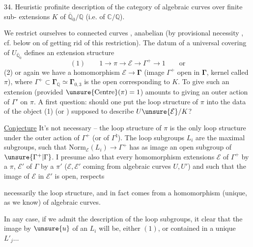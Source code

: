 34. Heuristic profinite description of the category
of algebraic curves  over  finite sub-
extensions $K$ of $\overline{\mathbb Q}_0/\mathbb Q$ (i.e. of $\mathbb C/\mathbb Q$).

We restrict ourselves to  connected curves , anabelian
(by provisional necessity \unsure{!}, cf. below on  of
getting rid of this restriction). The datum of a
universal covering of  $U_{\overline{\mathbb Q}_0}$ defines an
extension structure
\[
(1)\qquad 1\longrightarrow\pi\longrightarrow\mathcal E\longrightarrow\Gamma^{+}\longrightarrow1\qquad\text{or}
\]
(2) or again we have a homomorphism $\mathcal E\longrightarrow\boldsymbol{\Gamma}$
(image $\Gamma^{+}$ open in $\boldsymbol{\Gamma}$,
kernel called $\pi$),
where $\Gamma^{+}\subset\boldsymbol{\Gamma}_{\mathbb Q}\simeq\boldsymbol{\Gamma}_{0,3}$ is the open 
corresponding to $K$. To give such an
extension (provided $\unsure{\mathrm{Centre}}(\pi)=1$) amounts to
giving an outer action of $\Gamma'$ on $\pi$.
A first question: should one put the
loop structure of $\pi$ into the  data  of
the object (1) (or ) supposed to describe $U\unsure{\mathcal E}/K$?

\uline{Conjecture} It's not necessary -- the loop structure
of $\pi$ is the only loop structure 
under the outer action of $\Gamma^{+}$ (or of $\Gamma^{\natural}$). The
loop subgroups $L_i$ are the maximal
subgroups, such that $\mathrm{Norm}_{\mathcal E}(L_i)\longrightarrow\Gamma^{+}$ has
as image an open subgroup of $\unsure{\Gamma^{+}|\Gamma}$.
I
presume also that every homomorphism  extensions
$\mathcal E$ of $\Gamma^{+}$ by a $\pi$, $\mathcal E'$ of $\Gamma$ by a $\pi'$
($\mathcal E,\mathcal E'$ coming from algebraic curves $U,U'$) and such
that the image of $\mathcal E$ in $\mathcal E'$ is open, respects

necessarily the loop structure, and in fact
comes from a homomorphism (unique, as we know) of algebraic
curves.

In any case, if we admit the description of the
loop subgroups, it  clear that the image by
$\unsure{u}$ of an $L_i$ will be, either $(1)$, or contained
in a unique $L'_j\ldots$

